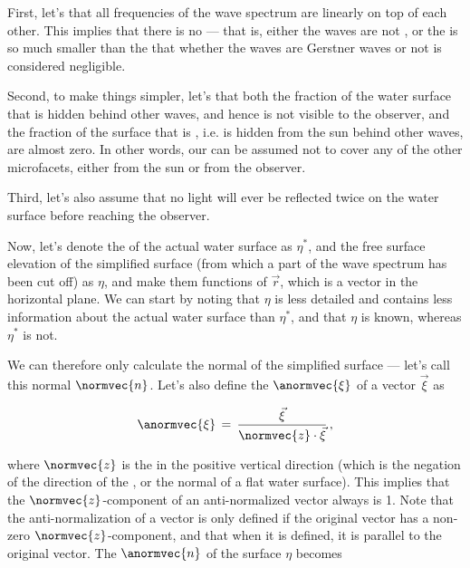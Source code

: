 First, let's \assume that all frequencies of the wave spectrum are \superposed linearly on top of each other. This implies that there is no  --- that is, either the waves are not , or the  is so much smaller than the \wavelength that whether the waves are Gerstner waves or not is considered negligible.

Second, to make things simpler, let's \assume that both the fraction of the water surface that is hidden behind other waves, and hence is not visible to the observer, and the fraction of the surface that is \shadowed, i.e. is hidden from the sun behind other waves, are almost zero. In other words, our \microfacets can be assumed not to cover any of the other microfacets, either from the sun or from the observer.

Third, let's also assume that no light will ever be reflected twice on the water surface before reaching the observer.

Now, let's denote the  of the actual water surface as $\eta^*$, and the free surface elevation of the simplified surface (from which a part of the wave spectrum has been cut off) as $\eta$, and make them functions of $\vec{r}$, which is a \twodimensional vector in the horizontal plane. We can start by noting that $\eta$ is less detailed and contains less information about the actual water surface than $\eta^*$, and that $\eta$ is known, whereas $\eta^*$ is not.

We can therefore only calculate the normal of the simplified surface --- let's call this normal $\normvec{n}$. Let's also define the  $\anormvec{\xi}$ of a vector $\vec{\xi}$ as

\begin{equation} \label{eq:anti_normal_definition}
\anormvec{\xi} \,=\, \frac{\vec{\xi}}{\normvec{z}\cdot\vec{\xi}}\,,
\end{equation}

where $\normvec{z}$ is the  in the positive vertical direction (which is the negation of the direction of the , or the normal of a flat water surface). This implies that the $\normvec{z}$-component of an anti-normalized vector always is 1. Note that the anti-normalization of a vector is only defined if the original vector has a non-zero $\normvec{z}$-component, and that when it is defined, it is parallel to the original vector. The  $\anormvec{n}$ of the surface $\eta$ becomes

